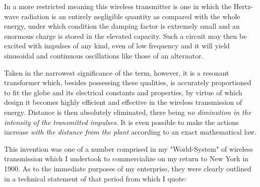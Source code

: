 \documentclass[a4paper,12pt,english,twoside,openright]{memoir}
\begin{document}
In a more restricted meaning this wireless transmitter is one in which the Hertz-wave radiation is 
an entirely negligible quantity as compared with the whole energy, under which condition the 
damping factor is extremely small and an enormous charge is stored in the elevated capacity.  
Such a circuit may then be excited with impulses of any kind, even of low frequency and it will 
yield sinusoidal and continuous oscillations like those of an alternator.  

Taken in the narrowest significance of the term, however, it is a resonant transformer which, 
besides possessing these qualities, is accurately proportioned to fit the globe and its electrical 
constants and properties, by virtue of which design it becomes highly efficient and effective in the 
wireless transmission of energy.  Distance is then absolutely eliminated, there being \emph{no diminution in the intensity of the transmitted impulses}.  It is even possible to make the actions 
increase \emph{with the distance from the plant} according to an exact mathematical law.  

This invention was one of a number comprised in my "World-System" of wireless transmission 
which I undertook to commercialize on my return to New York in 1900.  As to the immediate 
purposes of my enterprise, they were clearly outlined in a technical statement of that period from 
which I quote: 

\medskip
\end{document}
